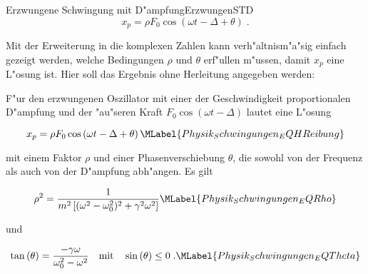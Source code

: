 \begin{MXContent}{Erzwungene Schwingung mit D"ampfung}{Erzwungen}{STD}
\begin{equation}
  x_p = \rho F_0 \cos\left(\omega t - \Delta + \theta \right) \; .
\end{equation}

Mit der Erweiterung in die komplexen Zahlen kann verh"altnism"a"sig einfach gezeigt werden, welche Bedingungen $\rho$ und $\theta$ erf"ullen m"ussen, damit $x_p$ eine L"osung ist. Hier soll das Ergebnis ohne Herleitung angegeben werden:

\begin{MInfo}
F"ur den erzwungenen Oszillator mit einer der Geschwindigkeit proportionalen D"ampfung und der "au"seren Kraft $F_0\cos\left(\omega t - \Delta\right)$ lautet eine L"osung

\begin{equation}
  x_p = \rho F_0 \cos\left(\omega t - \Delta + \theta\right) \MLabel{Physik_Schwingungen_EQHReibung}
\end{equation}

mit einem Faktor $\rho$ und einer Phasenverschiebung $\theta$, die sowohl von der Frequenz als auch von der D"ampfung abh"angen. Es gilt

\begin{equation}
  \rho^2 = \frac{1}{m^2\left[(\omega^2-\omega_0^2)^2+\gamma^2\omega^2\right]}\MLabel{Physik_Schwingungen_EQRho}
\end{equation}

und 

\begin{equation}
  \tan\left(\theta\right) = \frac{-\gamma\omega}{\omega_0^2-\omega^2} \quad\text{mit}\quad \sin\left(\theta\right)\leq 0 \; .\MLabel{Physik_Schwingungen_EQTheta}
\end{equation}

\end{MInfo}


\end{MXContent}

